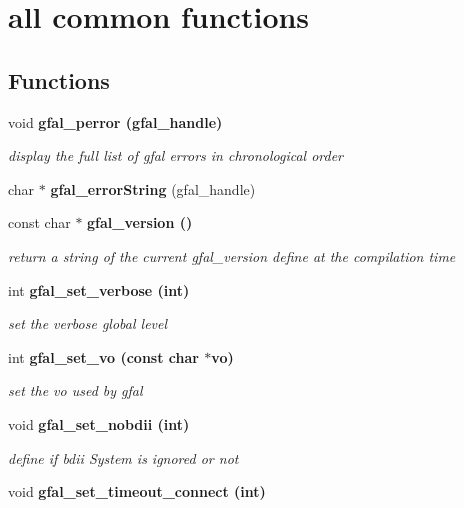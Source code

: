 \section{all common functions}
\label{group__common__group}
\subsection*{Functions}
\begin{CompactItemize}
\item 
void \bf{gfal\_\-perror} (gfal\_\-handle)\label{group__common__group_g21dc4cf2faa139b5813429eefb0c317a}

\begin{CompactList}\small\item\em display the full list of gfal errors in chronological order \item\end{CompactList}\item 
char $\ast$ \textbf{gfal\_\-error\-String} (gfal\_\-handle)\label{group__common__group_gb761574eb723a9c07a932cabec4f2426}

\item 
const char $\ast$ \bf{gfal\_\-version} ()
\begin{CompactList}\small\item\em return a string of the current gfal\_\-version define at the compilation time \item\end{CompactList}\item 
int \bf{gfal\_\-set\_\-verbose} (int)
\begin{CompactList}\small\item\em set the verbose global level \item\end{CompactList}\item 
int \bf{gfal\_\-set\_\-vo} (const char $\ast$vo)\label{group__common__group_gcf4ae9045b7e5a2a697b1bb1f05994a8}

\begin{CompactList}\small\item\em set the vo used by gfal \item\end{CompactList}\item 
void \bf{gfal\_\-set\_\-nobdii} (int)
\begin{CompactList}\small\item\em define if bdii System is ignored or not \item\end{CompactList}\item 
void \bf{gfal\_\-set\_\-timeout\_\-connect} (int)\label{group__common__group_g62f544258aa58af5122f40f0eb1a7c92}


\end{CompactItemize}
